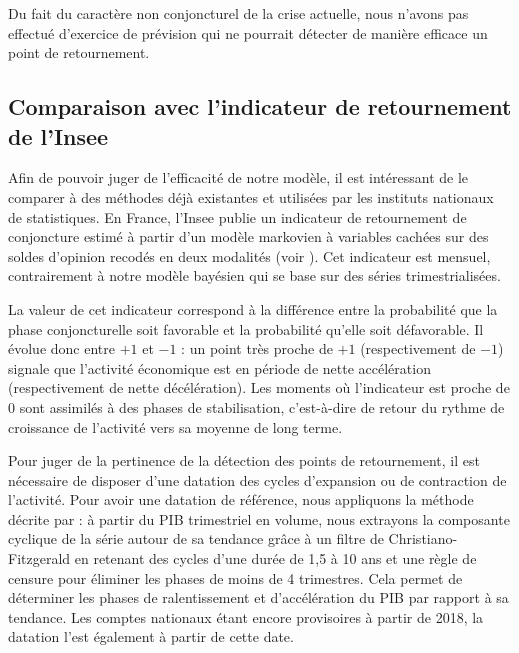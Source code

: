 \documentclass[10pt,french,french]{article}
\begin{document}
Du fait du caractère non conjoncturel de la crise actuelle, nous n'avons pas effectué d'exercice de prévision qui ne pourrait détecter de manière efficace un point de retournement.

\hypertarget{sec:indretFr}{%
\subsection{Comparaison avec l'indicateur de retournement de l'Insee}\label{sec:indretFr}}

Afin de pouvoir juger de l'efficacité de notre modèle, il est intéressant de le comparer à des méthodes déjà existantes et utilisées par les instituts nationaux de statistiques.
En France, l'Insee publie un indicateur de retournement de conjoncture estimé à partir d'un modèle markovien à variables cachées sur des soldes d'opinion recodés en deux modalités (voir \cite{indretFR}).
Cet indicateur est mensuel, contrairement à notre modèle bayésien qui se base sur des séries trimestrialisées.

La valeur de cet indicateur correspond à la différence entre la probabilité que la phase conjoncturelle soit favorable et la probabilité qu'elle soit défavorable.
Il évolue donc entre \(+1\) et \(-1\) : un point très proche de \(+1\) (respectivement de \(-1\)) signale que l'activité économique est en période de nette accélération (respectivement de nette décélération).
Les moments où l'indicateur est proche de 0 sont assimilés à des phases de stabilisation, c'est-à-dire de retour du rythme de croissance de l'activité vers sa moyenne de long terme.

Pour juger de la pertinence de la détection des points de retournement, il est nécessaire de disposer d'une datation des cycles d'expansion ou de contraction de l'activité.
Pour avoir une datation de référence, nous appliquons la méthode décrite par \cite{bardaji} : à partir du PIB trimestriel en volume, nous extrayons la composante cyclique de la série autour de sa tendance grâce à un filtre de Christiano-Fitzgerald en retenant des cycles d'une durée de 1,5 à 10 ans et une règle de censure pour éliminer les phases de moins de 4 trimestres.
Cela permet de déterminer les phases de ralentissement et d'accélération du PIB par rapport à sa tendance.
Les comptes nationaux étant encore provisoires à partir de 2018, la datation l'est également à partir de cette date.
\end{document}
